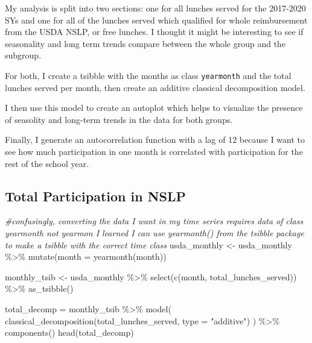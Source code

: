 \documentclass[
]{article}
\newenvironment{Shaded}{\begin{snugshade}}{\end{snugshade}}
\newcommand{\AttributeTok}[1]{\textcolor[rgb]{0.77,0.63,0.00}{#1}}
\newcommand{\CommentTok}[1]{\textcolor[rgb]{0.56,0.35,0.01}{\textit{#1}}}
\newcommand{\FunctionTok}[1]{\textcolor[rgb]{0.00,0.00,0.00}{#1}}
\newcommand{\NormalTok}[1]{#1}
\newcommand{\OtherTok}[1]{\textcolor[rgb]{0.56,0.35,0.01}{#1}}
\newcommand{\SpecialCharTok}[1]{\textcolor[rgb]{0.00,0.00,0.00}{#1}}
\newcommand{\StringTok}[1]{\textcolor[rgb]{0.31,0.60,0.02}{#1}}
\begin{document}
My analysis is split into two sections: one for all lunches served for
the 2017-2020 SYs and one for all of the lunches served which qualified
for whole reimbursement from the USDA NSLP, or free lunches. I thought
it might be interesting to see if seasonality and long term trends
compare between the whole group and the subgroup.

For both, I create a tsibble with the months as class \texttt{yearmonth}
and the total lunches served per month, then create an additive
classical decomposition model.

I then use this model to create an autoplot which helps to visualize the
presence of seasolity and long-term trends in the data for both groups.

Finally, I generate an autocorrelation function with a lag of 12 because
I want to see how much participation in one month is correlated with
participation for the rest of the school year.

\hypertarget{total-participation-in-nslp}{%
\subsection{Total Participation in
NSLP}\label{total-participation-in-nslp}}

\begin{Shaded}
\begin{Highlighting}[]
\CommentTok{\#confusingly, converting the data I want in my time series requires data of class \textasciigrave{}yearmonth\textasciigrave{} not \textasciigrave{}yearmon\textasciigrave{} I learned I can use \textasciigrave{}yearmonth()\textasciigrave{} from the tsibble package to make a tsibble with the correct time class }
\NormalTok{usda\_monthly }\OtherTok{\textless{}{-}}\NormalTok{ usda\_monthly }\SpecialCharTok{\%\textgreater{}\%} 
  \FunctionTok{mutate}\NormalTok{(}\AttributeTok{month =} \FunctionTok{yearmonth}\NormalTok{(month))}

\NormalTok{monthly\_tsib }\OtherTok{\textless{}{-}}\NormalTok{ usda\_monthly }\SpecialCharTok{\%\textgreater{}\%}
  \FunctionTok{select}\NormalTok{(}\FunctionTok{c}\NormalTok{(month, total\_lunches\_served)) }\SpecialCharTok{\%\textgreater{}\%} 
  \FunctionTok{as\_tsibble}\NormalTok{()}
\end{Highlighting}
\end{Shaded}

\begin{Shaded}
\begin{Highlighting}[]
\NormalTok{total\_decomp }\OtherTok{=}\NormalTok{ monthly\_tsib }\SpecialCharTok{\%\textgreater{}\%} 
  \FunctionTok{model}\NormalTok{(}
    \FunctionTok{classical\_decomposition}\NormalTok{(total\_lunches\_served, }\AttributeTok{type =} \StringTok{"additive"}\NormalTok{)}
\NormalTok{  ) }\SpecialCharTok{\%\textgreater{}\%} 
  \FunctionTok{components}\NormalTok{()}
\FunctionTok{head}\NormalTok{(total\_decomp)}
\end{Highlighting}
\end{Shaded}
\end{document}
